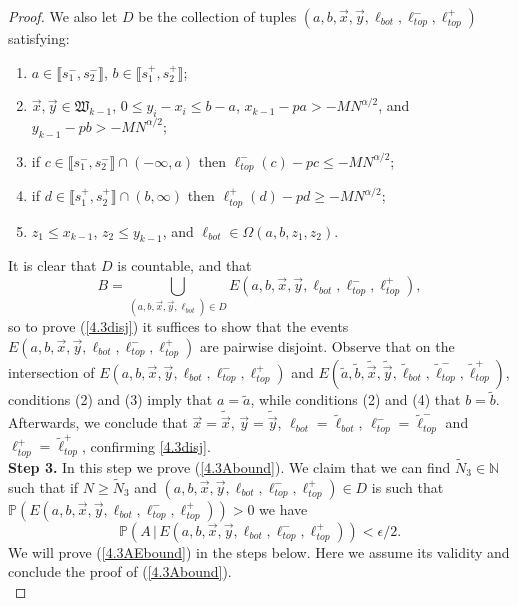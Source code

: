 \begin{proof}
	
	We also let $D$ be the collection of tuples $(a,b,\vec{x},\vec{y},\ell_{bot}, \ell_{top}^-, \ell_{top}^+)$ satisfying:
	\begin{enumerate}[label=(\arabic*)]
		\item $a \in \llbracket s_1^-, s_2^- \rrbracket$, $b \in \llbracket s_1^+, s_2^+ \rrbracket$;
		\item $\vec{x}, \vec{y} \in \mathfrak{W}_{k-1}$, $0 \leq y_i - x_i \leq b- a$, $x_{k-1} - pa > - MN^{\alpha/2}$, and $y_{k-1} - pb > - MN^{\alpha/2}$;
		\item if $c \in \llbracket s_1^-, s_2^- \rrbracket \cap (- \infty, a)$ then $\ell_{top}^-(c) - pc \leq -MN^{\alpha/2}$;
		\item if $d \in \llbracket s_1^+, s_2^+ \rrbracket \cap (b, \infty)$ then $\ell_{top}^+(d) - pd\geq -MN^{\alpha/2}$;
		\item $z_1\leq x_{k-1}$, $z_2\leq y_{k-1}$, and $\ell_{bot}\in\Omega(a,b,z_1,z_2)$.
	\end{enumerate} 
	It is clear that $D$ is countable, and that 
	$$B = \bigcup_{(a,b,\vec{x},\vec{y},\ell_{bot})\in D} E(a,b,\vec{x},\vec{y},\ell_{bot}, \ell_{top}^-, \ell_{top}^+),$$
	so to prove (\ref{4.3disj}) it suffices to show that the events $E(a,b,\vec{x},\vec{y},\ell_{bot}, \ell_{top}^-, \ell_{top}^+)$ are pairwise disjoint. Observe that on the intersection of $E(a,b,\vec{x},\vec{y},\ell_{bot}, \ell_{top}^-, \ell_{top}^+)$ and $E(\tilde a,\tilde b,\tilde{\vec{x}},\tilde{\vec{y}},\tilde{\ell}_{bot}, \tilde{\ell}_{top}^-, \tilde{\ell}_{top}^+)$, conditions (2) and (3) imply that $a = \tilde{a}$, while conditions (2) and (4) that $b = \tilde{b}$. Afterwards, we conclude that $\vec{x}=\tilde{\vec{x}}$, $\vec{y} = \tilde{\vec{y}}$, $\ell_{bot} = \tilde{\ell}_{bot}$, $\ell_{top}^- = \tilde{\ell}^-_{top}$ and $\ell_{top}^+ = \tilde{\ell}^+_{top}$, confirming \eqref{4.3disj}.\\
	
	
	\noindent\textbf{Step 3.} In this step we prove (\ref{4.3Abound}). We claim that we can find $\tilde{N}_3 \in \mathbb{N}$ such that if $N \geq \tilde{N}_3$ and $(a,b,\vec{x},\vec{y},\ell_{bot}, \ell_{top}^-, \ell_{top}^+) \in D$ is such that $\mathbb{P} \left( E(a,b,\vec{x},\vec{y},\ell_{bot}, \ell_{top}^-, \ell_{top}^+) \right) > 0$ we have
	\begin{equation}\label{4.3AEbound}
		\mathbb{P}(A\,|\,E(a,b,\vec{x},\vec{y},\ell_{bot}, \ell_{top}^-, \ell_{top}^+)) < \epsilon/2.
	\end{equation}
	We will prove (\ref{4.3AEbound}) in the steps below. Here we assume its validity and conclude the proof of (\ref{4.3Abound}).\\
	

\end{proof}
